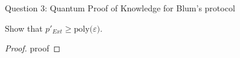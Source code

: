 \begin{solution}{Question 3: Quantum Proof of Knowledge for Blum’s protocol}\label{ques:x}
    \begin{question}
    Show that $p'_{Ext}\geq \text{poly($\varepsilon$)}$.
    \end{question}
    \tcblower{}
    \begin{proof}
    proof
    \end{proof}
\end{solution}
